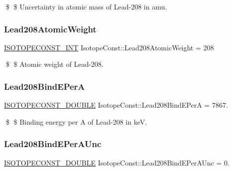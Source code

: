 \$ \$ Uncertainty in atomic mass of Lead-\/208 in amu. \mbox{\label{group___isotope_const-_lead-_pb208_ga1e927c2438d32b60260a7dd3896c1a32}} 
\subsubsection{\texorpdfstring{Lead208\+Atomic\+Weight}{Lead208AtomicWeight}}
{\footnotesize\ttfamily \mbox{\hyperlink{group___isotope_const-_macros_ga5f18360b3e99483a35c32d789e62621c}{I\+S\+O\+T\+O\+P\+E\+C\+O\+N\+S\+T\+\_\+\+I\+NT}} Isotope\+Const\+::\+Lead208\+Atomic\+Weight = 208}

\$ \$ Atomic weight of Lead-\/208. \mbox{\label{group___isotope_const-_lead-_pb208_gad0c8918e83485f4ccee893f5544d06d7}} 
\subsubsection{\texorpdfstring{Lead208\+Bind\+E\+PerA}{Lead208BindEPerA}}
{\footnotesize\ttfamily \mbox{\hyperlink{group___isotope_const-_macros_ga8f45a7272ce02c0b4c65c44636ed719a}{I\+S\+O\+T\+O\+P\+E\+C\+O\+N\+S\+T\+\_\+\+D\+O\+U\+B\+LE}} Isotope\+Const\+::\+Lead208\+Bind\+E\+PerA = 7867.}

\$ \$ Binding energy per A of Lead-\/208 in keV. \mbox{\label{group___isotope_const-_lead-_pb208_gae1906151833658d4f1e7154d0fa8a69d}} 
\subsubsection{\texorpdfstring{Lead208\+Bind\+E\+Per\+A\+Unc}{Lead208BindEPerAUnc}}
{\footnotesize\ttfamily \mbox{\hyperlink{group___isotope_const-_macros_ga8f45a7272ce02c0b4c65c44636ed719a}{I\+S\+O\+T\+O\+P\+E\+C\+O\+N\+S\+T\+\_\+\+D\+O\+U\+B\+LE}} Isotope\+Const\+::\+Lead208\+Bind\+E\+Per\+A\+Unc = 0.}

